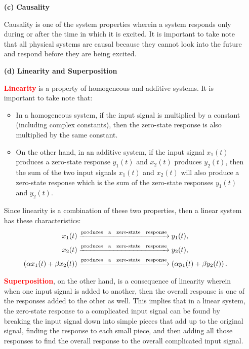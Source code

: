 \documentclass[a4paper, 12pt]{article}
\begin{document}
\begin{itemize}
\begin{itemize}
\pagebreak

\item[\textbf{(c)}]{\textbf{Causality}}

\begin{tcolorbox}
Causality is one of the system properties wherein a system responds only during or after the time in which it is excited. It is important to take note that all physical systems are causal because they cannot look into the future and respond before they are being excited.
\end{tcolorbox}
\item[\textbf{(d)}]{\textbf{Linearity and Superposition}}

\begin{tcolorbox}
\textcolor{red}{\textbf{Linearity}} is a property of homogeneous and additive systems. It is important to take note that:
\begin{itemize}
\item{In a homogeneous system, if the input signal is multiplied by a constant (including complex constants), then the zero-state response is also multiplied by the same constant.}
\item{On the other hand, in an additive system, if the input signal $x_{1}(t)$ produces a zero-state response $y_{1}(t)$ and $x_{2}(t)$ produces $y_{2}(t)$, then the sum of the two input signals $x_{1}(t)$ and $x_{2}(t)$ will also produce a zero-state response which is the sum of the zero-state responses $y_{1}(t)$ and $y_{2}(t)$.}
\end{itemize}

Since linearity is a combination of these two properties, then  a linear system has these characteristics:
\begin{equation}
\begin{gathered}
\begin{alignedat}{1}
x_{1}(t) &\xrightarrow{\text{produces \; a \; zero-state \; response}} y_{1}(t), \\
x_{2}(t) &\xrightarrow{\text{produces \; a \; zero-state \; response}} y_{2}(t), \\
\left( \alpha x_{1}(t) + \beta x_{2}(t) \right)&\xrightarrow{\text{produces \; a \; zero-state \; response}} \left( \alpha y_{1}(t) + \beta y_{2}(t) \right).
\end{alignedat}
\end{gathered}
\end{equation}

\textcolor{red}{\textbf{Superposition}}, on the other hand, is a consequence of linearity wherein when one input signal is added to another, then the overall response is one of the responses added to the other as well. This implies that in a linear system, the zero-state response to a complicated input signal can be found by breaking the input signal down into simple pieces that add up to the original signal, finding the response to each small piece, and then adding all those responses to find the overall response to the overall complicated input signal.
\end{tcolorbox}


\end{itemize}
\end{itemize}
\end{document}
